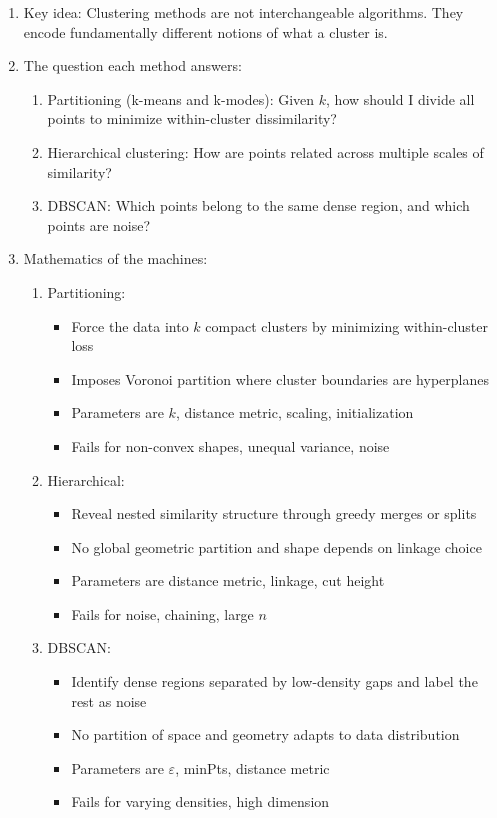 \documentclass{article}
\begin{document}
\begin{enumerate}
\item Key idea: Clustering methods are not interchangeable algorithms. They encode fundamentally different notions of what a cluster is.

\item The question each method answers:
\begin{enumerate}
\item Partitioning (k-means and k-modes): Given $k$, how should I divide all points to minimize within-cluster dissimilarity?
\item Hierarchical clustering: How are points related across multiple scales of similarity?
\item DBSCAN: Which points belong to the same dense region, and which points are noise?
\end{enumerate}

\item Mathematics of the machines:
\begin{enumerate}
\item Partitioning: 
\begin{itemize}
\item Force the data into $k$ compact clusters by minimizing within-cluster loss
\item Imposes Voronoi partition where cluster boundaries are hyperplanes
\item Parameters are $k$, distance metric, scaling, initialization
\item Fails for non-convex shapes, unequal variance, noise
\end{itemize}
\item Hierarchical: 
\begin{itemize}
\item Reveal nested similarity structure through greedy merges or splits
\item No global geometric partition and shape depends on linkage choice 
\item Parameters are distance metric, linkage, cut height
\item Fails for noise, chaining, large $n$
\end{itemize}
\item DBSCAN: 
\begin{itemize}
\item Identify dense regions separated by low-density gaps and label the rest as noise
\item No partition of space and geometry adapts to data distribution
\item Parameters are $\varepsilon$, minPts, distance metric
\item Fails for varying densities, high dimension
\end{itemize}
\end{enumerate}
\end{enumerate}
\end{document}
